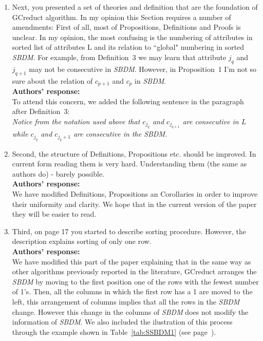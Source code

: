\documentclass{letter}
\begin{document}
\begin{letter}{}
\begin{enumerate}
	\item Next, you presented a set of theories and definition that are the foundation of GCreduct algorithm. In my opinion this Section requires a number of amendments:
	First of all, most of Propositions, Definitions and Proofs is unclear. In my opinion, the most confusing is the numbering of attributes in sorted list of attributes L and its relation to ``global" numbering in sorted \textit{SBDM}.  For example, from Definition~3 we may learn that attribute $j_{q}$ and $j_{q+1}$ may not be consecutive in \textit{SBDM}. However, in Proposition~1 I'm not so sure about the relation of $c_{p+1}$ and $c_{p}$ in \textit{SBDM}.\\
	\textbf{Authors’ response:}\\
	To attend this concern, we added the following sentence in the paragraph after Definition~3:\\
	\textit{Notice from the notation used above that $c_{j_q}$ and $c_{j_{q+1}}$ are consecutive in $L$ while $c_{j_q}$ and $c_{j_q+1}$ are consecutive in the \textit{SBDM}.}
	
	\item Second, the structure of  Definitions, Propositions etc. should be improved. In current form reading them is very hard. Understanding them (the same as authors do) - barely possible.\\
	\textbf{Authors’ response:}\\
	We have modified Definitions, Propositions an Corollaries in order to improve their uniformity and clarity. We hope that in the current version of the paper they will be easier to read. 
	
	\item Third, on page 17 you started to describe sorting procedure. However, the description explains sorting of only one row.\\
	\textbf{Authors’ response:}\\
	 We have modified this part of the paper explaining that in the same way as other algorithms previously reported in the literature, GCreduct arranges the \textit{SBDM} by moving to the first position one of the rows with the fewest number of 1's. Then, all the columns in which the first row has a 1 are moved to the left, this arrangement of columns implies that all the rows in the \textit{SBDM} change. However this change in the columns of \textit{SBDM} does not modify the information of \textit{SBDM}. We also included the ilustration of this process through the example shown in Table~\ref{tab:SSBDM1} (see page~\pageref{arrange}).
	

\end{enumerate}
\end{letter}
\end{document}
